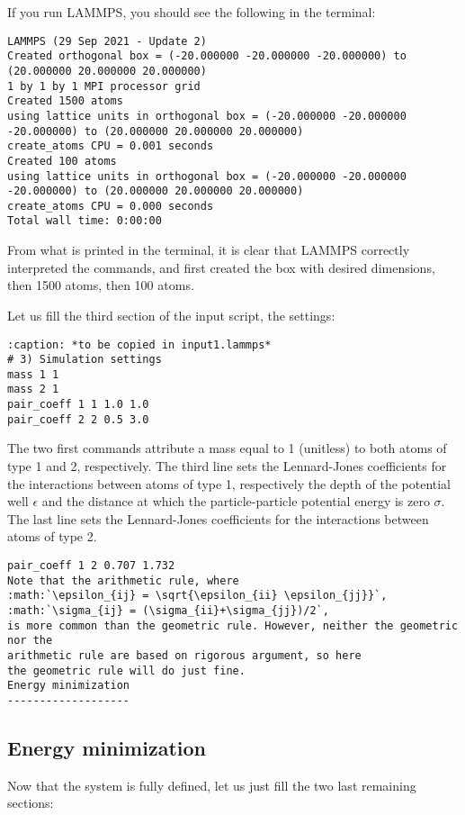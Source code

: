 If you run LAMMPS, you should see the following in the
terminal:

\begin{verbatim}
LAMMPS (29 Sep 2021 - Update 2)
Created orthogonal box = (-20.000000 -20.000000 -20.000000) to (20.000000 20.000000 20.000000)
1 by 1 by 1 MPI processor grid
Created 1500 atoms
using lattice units in orthogonal box = (-20.000000 -20.000000 -20.000000) to (20.000000 20.000000 20.000000)
create_atoms CPU = 0.001 seconds
Created 100 atoms
using lattice units in orthogonal box = (-20.000000 -20.000000 -20.000000) to (20.000000 20.000000 20.000000)
create_atoms CPU = 0.000 seconds
Total wall time: 0:00:00
\end{verbatim}

\noindent From what is printed in the terminal, it is clear that
LAMMPS correctly interpreted the commands, and first created
the box with desired dimensions, then 1500 atoms, then 100
atoms.

Let us fill the third section of the input script, the settings:

\begin{verbatim}
:caption: *to be copied in input1.lammps*
# 3) Simulation settings
mass 1 1
mass 2 1
pair_coeff 1 1 1.0 1.0
pair_coeff 2 2 0.5 3.0
\end{verbatim}

\noindent The two first commands attribute a mass
equal to 1 (unitless) to both atoms of type 1 and 2,
respectively. The third line sets the Lennard-Jones
coefficients for the interactions between atoms of type 1,
respectively the depth of the potential well
$\epsilon$ and the distance at which the
particle-particle potential energy is zero $\sigma$. 
The last line sets the Lennard-Jones coefficients for
the interactions between atoms of type 2.

\begin{verbatim}
pair_coeff 1 2 0.707 1.732 
Note that the arithmetic rule, where 
:math:`\epsilon_{ij} = \sqrt{\epsilon_{ii} \epsilon_{jj}}`,
:math:`\sigma_{ij} = (\sigma_{ii}+\sigma_{jj})/2`, 
is more common than the geometric rule. However, neither the geometric nor the
arithmetic rule are based on rigorous argument, so here
the geometric rule will do just fine. 
Energy minimization
-------------------
\end{verbatim}

\subsection{Energy minimization}
\noindent 
Now that the system is fully defined, let us just fill the two last remaining sections:

